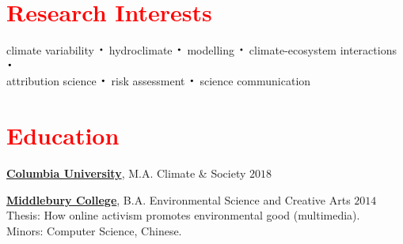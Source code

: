 \documentclass[margin, line, palatino, courier, 10pt]{res}
\newcommand*{\bigDot}{\raisebox{-0.25ex}{\scalebox{2.1}{$\cdot$}}}
\newcommand{\CU}{http://climatesociety.ei.columbia.edu/}
\newcommand{\Midd}{http://www.middlebury.edu/academics/es}
\begin{document}
 


\begin{resume}



\section{\sc \textcolor{Red}{\large{Research Interests}}}
climate variability $\bigDot$  hydroclimate $\bigDot$  modelling $\bigDot$  climate-ecosystem interactions $\bigDot$  \\attribution science $\bigDot$ risk assessment $\bigDot$ science communication  


\vspace{0.15in}
\section{\sc \textcolor{Red}{\large{Education}}}

{\bf \href{\CU}{Columbia University}}, M.A. Climate \& Society \hfill {$2018$}
\\
    \vspace*{-.15in} 
  
{\bf \href{\Midd}{Middlebury College}}, B.A. Environmental Science and Creative Arts 
\hfill {$2014$}
\\
    Thesis:  How online activism promotes environmental good (multimedia).   \\ 
    Minors: Computer Science, Chinese. 
 


\end{resume}
\end{document}
